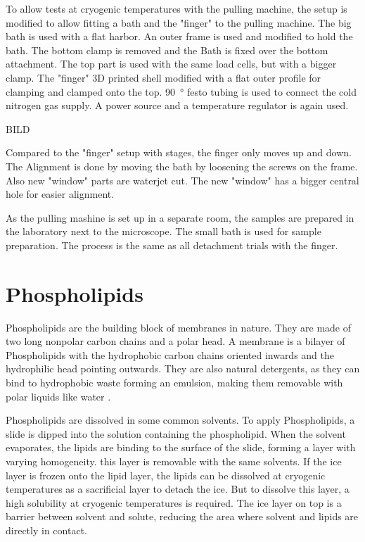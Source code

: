 To allow tests at cryogenic temperatures with the pulling machine, the setup is modified to allow fitting a bath and the "finger" to the pulling machine. The big bath is used with a flat harbor. An outer frame is used and modified to hold the bath. The bottom clamp is removed and the Bath is fixed over the bottom attachment. The top part is used with the same load cells, but with a bigger clamp. The "finger" 3D printed shell modified with a flat outer profile for clamping and clamped onto the top. \SI{90}{\degree} festo tubing is used to connect the cold nitrogen gas supply. A power source and a temperature regulator is again used. 

BILD

Compared to the "finger" setup with stages, the finger only moves up and down. The Alignment is done by moving the bath by loosening the screws on the frame. Also new "window" parts are waterjet cut. The new "window" has a bigger central hole for easier alignment.

As the pulling mashine is set up in a separate room, the samples are prepared in the laboratory next to the microscope. The small bath is used for sample preparation. The process is the same as all detachment trials with the finger. 

\section{Phospholipids}
\label{section:metodeLipide}

Phospholipids are the building block of membranes in nature. They are made of two long nonpolar carbon chains and a polar head. A membrane is a bilayer of Phospholipids with the hydrophobic carbon chains oriented inwards and the hydrophilic head pointing outwards. They are also natural detergents, as they can bind to hydrophobic waste forming an emulsion, making them removable with polar liquids like water \cite{SriramaM.BhairiPh.D..2001}.

Phospholipids are dissolved in some common solvents. To apply Phospholipids, a slide is dipped into the solution containing the phospholipid. When the solvent evaporates, the lipids are binding to the surface of the slide, forming a layer with varying homogeneity. this layer is removable with the same solvents. If the ice layer is frozen onto the lipid layer, the lipids can be dissolved at cryogenic temperatures as a sacrificial layer to detach the ice. But to dissolve this layer, a high solubility at cryogenic temperatures is required. The ice layer on top is a barrier between solvent and solute, reducing the area where solvent and lipids are directly in contact. 

